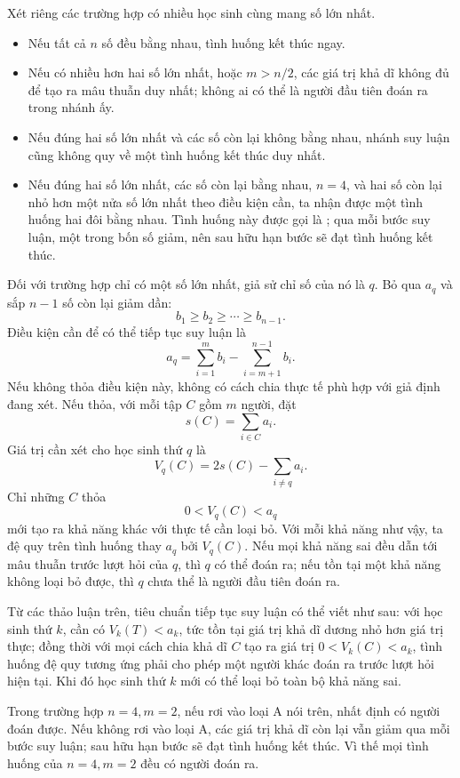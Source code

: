 \documentclass[11pt]{article}
\begin{document}
Xét riêng các trường hợp có nhiều học sinh cùng mang số lớn nhất.
\begin{itemize}
  \item Nếu tất cả \(n\) số đều bằng nhau, tình huống kết thúc ngay.
  \item Nếu có nhiều hơn hai số lớn nhất, hoặc \(m>n/2\), các giá trị khả dĩ
        không đủ để tạo ra mâu thuẫn duy nhất; không ai có thể là người đầu
        tiên đoán ra trong nhánh ấy.
  \item Nếu đúng hai số lớn nhất và các số còn lại không bằng nhau, nhánh suy
        luận cũng không quy về một tình huống kết thúc duy nhất.
  \item Nếu đúng hai số lớn nhất, các số còn lại bằng nhau, \(n=4\), và hai
        số còn lại nhỏ hơn một nửa số lớn nhất theo điều kiện cần, ta nhận
        được một tình huống hai đôi bằng nhau. Tình huống này được gọi là
        ; qua mỗi bước suy luận, một trong bốn số giảm, nên sau
        hữu hạn bước sẽ đạt tình huống kết thúc.
\end{itemize}

Đối với trường hợp chỉ có một số lớn nhất, giả sử chỉ số của nó là \(q\). Bỏ
qua \(a_q\) và sắp \(n-1\) số còn lại giảm dần:
\[
  b_1\ge b_2\ge\cdots\ge b_{n-1}.
\]
Điều kiện cần để có thể tiếp tục suy luận là
\[
  a_q=\sum_{i=1}^{m}b_i-\sum_{i=m+1}^{n-1}b_i.
\]
Nếu không thỏa điều kiện này, không có cách chia thực tế phù hợp với giả định
đang xét. Nếu thỏa, với mỗi tập \(C\) gồm \(m\) người, đặt
\[
  s(C)=\sum_{i\in C}a_i.
\]
Giá trị cần xét cho học sinh thứ \(q\) là
\[
  V_q(C)=2s(C)-\sum_{i\ne q}a_i.
\]
Chỉ những \(C\) thỏa
\[
  0<V_q(C)<a_q
\]
mới tạo ra khả năng khác với thực tế cần loại bỏ. Với mỗi khả năng như vậy,
ta đệ quy trên tình huống thay \(a_q\) bởi \(V_q(C)\). Nếu mọi khả năng sai
đều dẫn tới mâu thuẫn trước lượt hỏi của \(q\), thì \(q\) có thể đoán ra;
nếu tồn tại một khả năng không loại bỏ được, thì \(q\) chưa thể là người đầu
tiên đoán ra.

Từ các thảo luận trên, tiêu chuẩn tiếp tục suy luận có thể viết như sau:
với học sinh thứ \(k\), cần có \(V_k(T)<a_k\), tức tồn tại giá trị khả dĩ
dương nhỏ hơn giá trị thực; đồng thời với mọi cách chia khả dĩ \(C\) tạo ra
giá trị \(0<V_k(C)<a_k\), tình huống đệ quy tương ứng phải cho phép một
người khác đoán ra trước lượt hỏi hiện tại. Khi đó học sinh thứ \(k\) mới có
thể loại bỏ toàn bộ khả năng sai.

Trong trường hợp \(n=4,m=2\), nếu rơi vào loại A nói trên, nhất định có người
đoán được. Nếu không rơi vào loại A, các giá trị khả dĩ còn lại vẫn giảm qua
mỗi bước suy luận; sau hữu hạn bước sẽ đạt tình huống kết thúc. Vì thế mọi
tình huống của \(n=4,m=2\) đều có người đoán ra.
\end{document}
